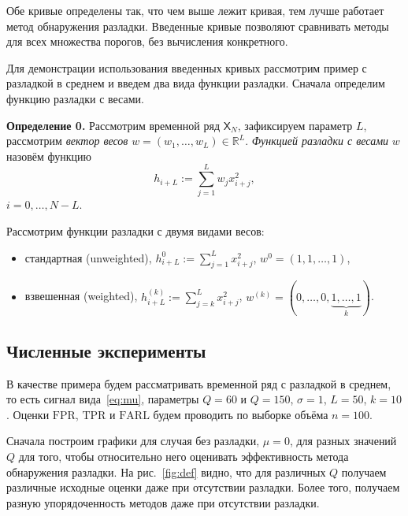 \documentclass{math-mech-sci}
\newcommand{\X}{\mathsf X}
\newcommand{\FPR}{\mathrm{FPR}}
\newcommand{\TPR}{\mathrm{TPR}}
\newcommand{\FARL}{\mathrm{FARL}}
\begin{document}
Обе кривые определены так, что чем выше лежит кривая, тем лучше работает метод обнаружения разладки. Введенные кривые позволяют сравнивать методы для всех множества порогов, без вычисления конкретного.
	
Для демонстрации использования введенных кривых рассмотрим пример с разладкой в среднем и введем два вида функции разладки. Сначала определим функцию разладки с весами.
	
	\textbf{Определение 0.} Рассмотрим временной ряд $\X_N$, зафиксируем параметр $L$, рассмотрим \textit{вектор весов} $w=(w_1,\ldots,w_L)\in\mathbb R^L$. \textit{Функцией разладки с весами} $w$ назовём функцию
	\begin{equation}
		h_{i+L}:=\sum\limits_{j=1}^Lw_jx_{i+j}^2,
	\end{equation}
	$i=0,\ldots,N-L$.

Рассмотрим функции разладки с двумя видами весов:
	\begin{itemize}
		\item стандартная (unweighted), $h_{i+L}^0:=\sum\limits_{j=1}^Lx_{i+j}^2$, $w^0=(1,1,\ldots,1)$,
		\item взвешенная (weighted), $h_{i+L}^{(k)}:=\sum\limits_{j=k}^Lx_{i+j}^2$, $w^{(k)}=(0,\ldots,0,\underbrace{1,\ldots,1}_{k})$.
	\end{itemize}


\subsection{Численные эксперименты}
В качестве примера будем рассматривать временной ряд с разладкой в среднем, то есть сигнал вида~\eqref{eq:mu}, параметры $Q=60$ и $Q =150$, $\sigma=1$, $L=50$, $k=10$. Оценки $\FPR$, $\TPR$ и $\FARL$ будем проводить по выборке объёма $n=100$.

Сначала построим графики для случая без разладки, $\mu=0$, для разных значений $Q$ для того, чтобы относительно него оценивать эффективность метода обнаружения разладки. На рис.~\ref{fig:def} видно, что для различных $Q$ получаем различные исходные оценки даже при отсутствии разладки. Более того, получаем разную упорядоченность методов даже при отсутствии разладки.
\end{document}
